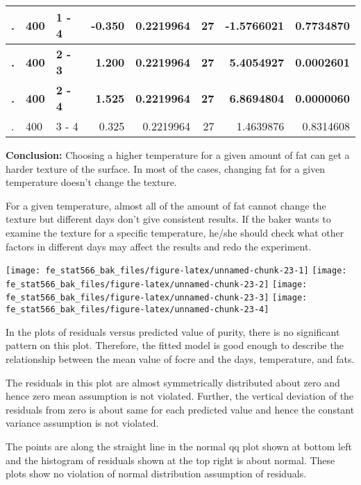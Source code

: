 \documentclass[12pt,]{article}
\begin{document}
\begin{table}[H]
\begin{tabular}{l|l|l|r|r|r|r|r}
\hline
. & 400 & 1 - 4 & -0.350 & 0.2219964 & 27 & -1.5766021 & 0.7734870\\
\hline
\rowcolor[HTML]{EAFAF1}  \textbf{.} & \textbf{400} & \textbf{2 - 3} & \textbf{1.200} & \textbf{0.2219964} & \textbf{27} & \textbf{5.4054927} & \textbf{0.0002601}\\
\hline
\rowcolor[HTML]{EAFAF1}  \textbf{.} & \textbf{400} & \textbf{2 - 4} & \textbf{1.525} & \textbf{0.2219964} & \textbf{27} & \textbf{6.8694804} & \textbf{0.0000060}\\
\hline
. & 400 & 3 - 4 & 0.325 & 0.2219964 & 27 & 1.4639876 & 0.8314608\\
\hline
\end{tabular}
\endgroup{}
\end{table}

\textbf{Conclusion:} Choosing a higher temperature for a given amount of
fat can get a harder texture of the surface. In most of the cases,
changing fat for a given temperature doesn't change the texture.

For a given temperature, almost all of the amount of fat cannot change
the texture but different days don't give consistent results. If the
baker wants to examine the texture for a specific temperature, he/she
should check what other factors in different days may affect the results
and redo the experiment.

\texttt{[image: fe\_stat566\_bak\_files/figure-latex/unnamed-chunk-23-1]}
\texttt{[image: fe\_stat566\_bak\_files/figure-latex/unnamed-chunk-23-2]}
\texttt{[image: fe\_stat566\_bak\_files/figure-latex/unnamed-chunk-23-3]}
\texttt{[image: fe\_stat566\_bak\_files/figure-latex/unnamed-chunk-23-4]}

In the plots of residuals versus predicted value of purity, there is no
significant pattern on this plot. Therefore, the fitted model is good
enough to describe the relationship between the mean value of focre and
the days, temperature, and fats.

The residuals in this plot are almost symmetrically distributed about
zero and hence zero mean assumption is not violated. Further, the
vertical deviation of the residuals from zero is about same for each
predicted value and hence the constant variance assumption is not
violated.

The points are along the straight line in the normal qq plot shown at
bottom left and the histogram of residuals shown at the top right is
about normal. These plots show no violation of normal distribution
assumption of residuals.
\end{document}
